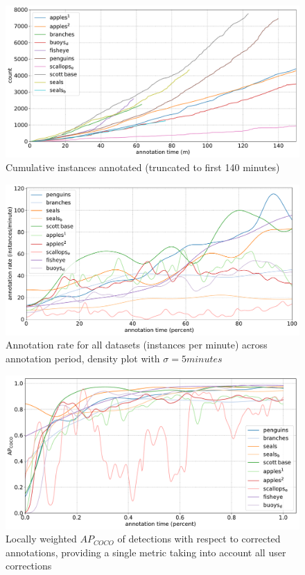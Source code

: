 \begin{figure}[ht!]
\centering
\includegraphics[width=1.0\linewidth]{charts/summaries/cumulative_instances_crop.pdf}
\caption{ Cumulative instances annotated (truncated to first 140 minutes)  }
\label{fig:cumulative_instances}
\end{figure}

\begin{figure}[ht!]
\centering
\includegraphics[width=1.0\linewidth]{charts/summaries/instance_rates.pdf}
\caption{ Annotation rate for all datasets (instances per minute) across annotation period, density plot with $\sigma=5minutes$ }
\label{fig:annotation_rate}
\end{figure}


\begin{figure}[ht!]
\centering
\includegraphics[width=1.0\linewidth]{charts/running_maps/overall.pdf}
\caption{ Locally weighted $AP_{COCO}$ of detections with respect to corrected annotations, providing a single metric taking into account all user corrections }
\label{fig:average_precision_test}
\end{figure}

